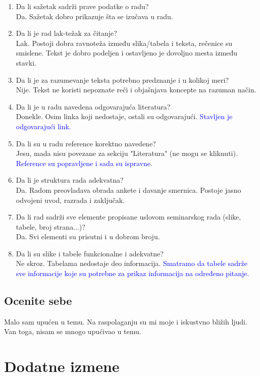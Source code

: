 \documentclass[a4paper]{report}
\newcommand{\odgovor}[1]{\textcolor{blue}{#1}}
\begin{document}
\begin{enumerate}
\item Da li sažetak sadrži prave podatke o radu?\\
Da. Sažetak dobro prikazuje šta se izučava u radu.

\item Da li je rad lak-težak za čitanje?\\
Lak. Postoji dobra ravnoteža između slika/tabela i teksta, rečenice su smislene. Tekst je dobro podeljen i ostavljeno je dovoljno mesta između stavki. 

\item Da li je za razumevanje teksta potrebno predznanje i u kolikoj meri?\\
Nije. Tekst ne koristi nepoznate reči i objašnjava koncepte na razuman način.

\item Da li je u radu navedena odgovarajuća literatura?\\
Donekle. Osim linka koji nedostaje, ostali su odgovarajući. \odgovor{Stavljen je odgovarajući link.}

\item Da li su u radu reference korektno navedene?\\
Jesu, mada nisu povezane za sekciju "Literatura" (ne mogu se kliknuti). \odgovor{Reference su popravljene i sada su ispravne.}

\item Da li je struktura rada adekvatna?\\
Da. Radom preovladava obrada ankete i davanje smernica. Postoje jasno odvojeni uvod, razrada i zaključak.

\item Da li rad sadrži sve elemente propisane uslovom seminarskog rada (slike, tabele, broj strana...)?\\
Da. Svi elementi su prisutni i u dobrom broju.

\item Da li su slike i tabele funkcionalne i adekvatne?\\
Ne skroz. Tabelama nedostaje deo informacija. \odgovor{Smatramo da tabele sadrže sve informacije koje su potrebne za prikaz informacija na određeno pitanje.}
\end{enumerate}

\section{Ocenite sebe}
Malo sam upućen u temu. Na raspolaganju su mi moje i iskustvno bližih ljudi. Van toga, nisam se mnogo upućivao u temu.


\chapter{Dodatne izmene}
\end{document}

